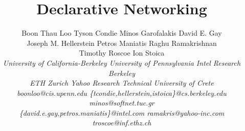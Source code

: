 \documentclass{research4cacm}
\begin{document}
\title{Declarative Networking}
%
%
%
%
%

\author{
\alignauthor Boon Thau Loo \quad Tyson Condie \quad Minos Garofalakis \quad David E. Gay\\
\vspace{0.05in}
Joseph M. Hellerstein \quad Petros Maniatis \quad Raghu Ramakrishnan\\
\vspace{0.05in}
Timothy Roscoe \quad Ion Stoica\\
\vspace{0.05in}
\fontsize{10}{10}\selectfont\itshape
\vspace{0.05in}
University of California-Berkeley \quad University of Pennsylvania \quad
Intel Research Berkeley\\
ETH Zurich \quad Yahoo Research \quad Technical University of Crete\\
\vspace{0.05in}
\fontsize{9}{9}\selectfont\ttfamily\upshape
boonloo@cis.upenn.edu \quad \{tcondie,hellerstein,istoica\}@cs.berkeley.edu \quad minos@softnet.tuc.gr\\
\{david.e.gay,petros.maniatis\}@intel.com \quad ramakris@yahoo-inc.com \quad troscoe@inf.ethz.ch
}
\end{document}
